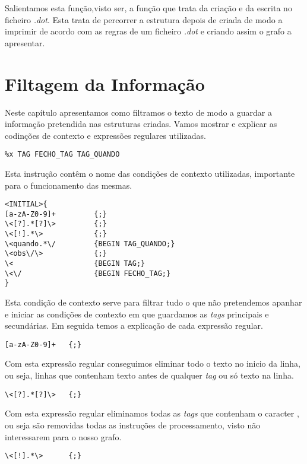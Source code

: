 \documentclass{report}
\def\titulo#1{\section{#1}}
\begin{document}
    Salientamos esta função,visto ser, a função que trata da criação e da escrita no ficheiro \textit{.dot}. Esta trata de percorrer a estrutura depois de criada de modo a imprimir de acordo com as regras de um ficheiro \textit{.dot} e criando assim o grafo a apresentar.

\titulo{Filtagem da Informação}

    Neste capítulo apresentamos como filtramos o texto de modo a guardar a informação pretendida nas estruturas criadas.
    Vamos mostrar e explicar as codinções de contexto e expressões regulares utilizadas.


\bigskip

\begin{verbatim}
%x TAG FECHO_TAG TAG_QUANDO
\end{verbatim}
    
    Esta instrução contêm o nome das condições de contexto utilizadas, importante para o  funcionamento das mesmas. 

\begin{verbatim}
<INITIAL>{
[a-zA-Z0-9]+         {;}
\<[?].*[?]\>         {;}
\<[!].*\>            {;}
\<quando.*\/         {BEGIN TAG_QUANDO;}
\<obs\/\>            {;}
\<                   {BEGIN TAG;}
\<\/                 {BEGIN FECHO_TAG;}
}
\end{verbatim}

    Esta condição de contexto serve para filtrar tudo o que não pretendemos apanhar e iniciar as condições de contexto em que guardamos as \textit{tags} principais e secundárias. Em seguida temos a explicação de cada expressão regular. 

\begin{verbatim}
[a-zA-Z0-9]+   {;}
\end{verbatim}
    
    Com esta expressão regular conseguimos eliminar todo o texto no inicio da linha, ou seja, linhas que contenham texto antes de qualquer \textit{tag} ou só texto na linha.
    
\begin{verbatim}
\<[?].*[?]\>   {;}
\end{verbatim}

    Com esta expressão regular eliminamos todas as \textit{tags} que contenham o caracter \textbf{\?}, ou seja são removidas todas as instruções de processamento, visto não interessarem para o nosso grafo.

\begin{verbatim}
\<[!].*\>      {;}
\end{verbatim}
\end{document}
